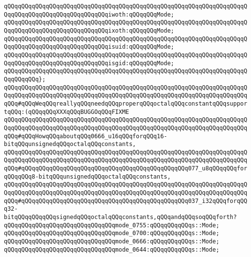 \verb|qQQqqQQqqQQqqQQqqQQqqQQqqQQqqQQqqQQqqQQqqQQqqQQqqQQqqQQqqQQqqQQqqQQqqQQqqQQqqQQqqQQqqQQqqQQqqQQqqQQqiwoth:qQQqqQQqMode;|\newline
\verb|qQQqqQQqqQQqqQQqqQQqqQQqqQQqqQQqqQQqqQQqqQQqqQQqqQQqqQQqqQQqqQQqqQQqqQQqqQQqqQQqqQQqqQQqqQQqqQQqqQQqixoth:qQQqqQQqMode;|\newline
\verb|qQQqqQQqqQQqqQQqqQQqqQQqqQQqqQQqqQQqqQQqqQQqqQQqqQQqqQQqqQQqqQQqqQQqqQQqqQQqqQQqqQQqqQQqqQQqqQQqqQQqisuid:qQQqqQQqMode;|\newline
\verb|qQQqqQQqqQQqqQQqqQQqqQQqqQQqqQQqqQQqqQQqqQQqqQQqqQQqqQQqqQQqqQQqqQQqqQQqqQQqqQQqqQQqqQQqqQQqqQQqqQQqisgid:qQQqqQQqMode;|\newline
\newline
\verb|qQQqqQQqqQQqqQQqqQQqqQQqqQQqqQQqqQQqqQQqqQQqqQQqqQQqqQQqqQQqqQQqqQQqqQQqqQQqqQQq};|\newline
\newline
\verb|qQQqqQQqqQQqqQQqqQQqqQQqqQQqqQQqqQQqqQQqqQQqqQQqqQQqqQQqqQQqqQQqqQQqqQQqqQQqqQQqqQQqqQQqqQQqqQQqqQQqqQQqqQQqqQQqqQQqqQQqqQQqqQQqqQQqqQQqqQQqqQQq#qQQqWeqQQqreallyqQQqneedqQQqproperqQQqoctalqQQqconstantqQQqsupportqQQq:(qQQqqQQqXXXqQQqBUGGOqQQqFIXME|\newline
\verb|qQQqqQQqqQQqqQQqqQQqqQQqqQQqqQQqqQQqqQQqqQQqqQQqqQQqqQQqqQQqqQQqqQQqqQQqqQQqqQQqqQQqqQQqqQQqqQQqqQQqqQQqqQQqqQQqqQQqqQQqqQQqqQQqqQQqqQQqqQQqqQQq#qQQqHowqQQqaboutqQQq0666_u16qQQqforqQQq16-bitqQQqunsignedqQQqoctalqQQqconstants,|\newline
\verb|qQQqqQQqqQQqqQQqqQQqqQQqqQQqqQQqqQQqqQQqqQQqqQQqqQQqqQQqqQQqqQQqqQQqqQQqqQQqqQQqqQQqqQQqqQQqqQQqqQQqqQQqqQQqqQQqqQQqqQQqqQQqqQQqqQQqqQQqqQQqqQQq#qQQqqQQqqQQqqQQqqQQqqQQqqQQqqQQqqQQqqQQqqQQqqQQq077_u8qQQqqQQqforqQQqqQQq8-bitqQQqunsignedqQQqoctalqQQqconstants,|\newline
\verb|qQQqqQQqqQQqqQQqqQQqqQQqqQQqqQQqqQQqqQQqqQQqqQQqqQQqqQQqqQQqqQQqqQQqqQQqqQQqqQQqqQQqqQQqqQQqqQQqqQQqqQQqqQQqqQQqqQQqqQQqqQQqqQQqqQQqqQQqqQQqqQQq#qQQqqQQqqQQqqQQqqQQqqQQqqQQqqQQqqQQqqQQqqQQqqQQq037_i32qQQqforqQQq32-bitqQQqqQQqqQQqsignedqQQqoctalqQQqconstants,qQQqandqQQqsoqQQqforth?|\newline
\newline
\verb|qQQqqQQqqQQqqQQqqQQqqQQqqQQqqQQqmode_0755:qQQqqQQqqQQqs::Mode;|\newline
\verb|qQQqqQQqqQQqqQQqqQQqqQQqqQQqqQQqmode_0700:qQQqqQQqqQQqs::Mode;|\newline
\verb|qQQqqQQqqQQqqQQqqQQqqQQqqQQqqQQqmode_0666:qQQqqQQqqQQqs::Mode;|\newline
\verb|qQQqqQQqqQQqqQQqqQQqqQQqqQQqqQQqmode_0644:qQQqqQQqqQQqs::Mode;|\newline
